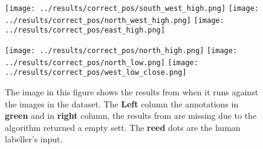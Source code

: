 \begin{figure}
\begin{center}
    \begin{minipage}[b]{0.40\linewidth}
        \texttt{[image: ../results/correct\_pos/south\_west\_high.png]}\vspace{4pt}
        \texttt{[image: ../results/correct\_pos/north\_west\_high.png]}\vspace{4pt}
        \texttt{[image: ../results/correct\_pos/east\_high.png]}\vspace{4pt}
    \end{minipage}
    \begin{minipage}[b]{0.40\linewidth}
        \texttt{[image: ../results/correct\_pos/north\_high.png]}\vspace{4pt}
        \texttt{[image: ../results/correct\_pos/north\_low.png]}\vspace{4pt}
        \texttt{[image: ../results/correct\_pos/west\_low\_close.png]}\vspace{4pt}
    \end{minipage}
\end{center}
\caption{The image in this figure shows the results from \openpose when it runs against the images in the dataset. The \textbf{Left} column the \openpose annotations in \textbf{green} and in \textbf{right} column, the results from \openpose are missing due to the algorithm returned a empty sett. The \textbf{reed} dots are the human labeller's input.}
\label{fig:res:camerapose}
\end{figure}



